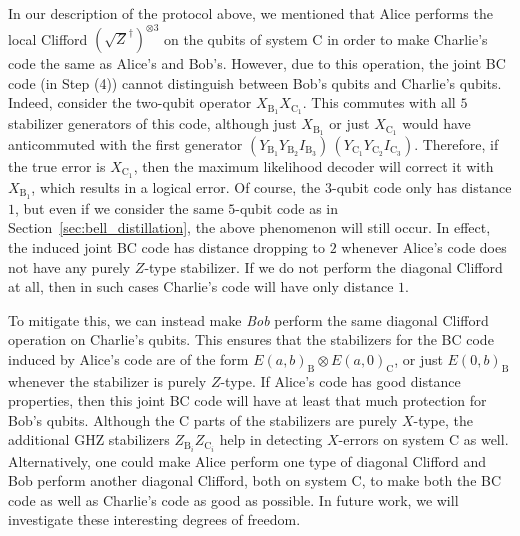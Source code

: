 \documentclass[journal,onecolumn]{IEEEtran}
\begin{document}
In our description of the protocol above, we mentioned that Alice performs the local Clifford $\left( \sqrt{Z}^\dagger \right)^{\otimes 3}$ on the qubits of system C in order to make Charlie's code the same as Alice's and Bob's.
However, due to this operation, the joint BC code (in Step (4)) cannot distinguish between Bob's qubits and Charlie's qubits.
Indeed, consider the two-qubit operator $X_{\text{B}_1} X_{\text{C}_1}$.
This commutes with all $5$ stabilizer generators of this code, although just $X_{\text{B}_1}$ or just $X_{\text{C}_1}$ would have anticommuted with the first generator $(Y_{\text{B}_1} Y_{\text{B}_2} I_{\text{B}_3}) \, (Y_{\text{C}_1} Y_{\text{C}_2} I_{\text{C}_3})$.
Therefore, if the true error is $X_{\text{C}_1}$, then the maximum likelihood decoder will correct it with $X_{\text{B}_1}$, which results in a logical error.
Of course, the $3$-qubit code only has distance $1$, but even if we consider the same $5$-qubit code as in Section~\ref{sec:bell_distillation}, the above phenomenon will still occur.
In effect, the induced joint BC code has distance dropping to $2$ whenever Alice's code does not have any purely $Z$-type stabilizer.
If we do not perform the diagonal Clifford at all, then in such cases Charlie's code will have only distance $1$.

To mitigate this, we can instead make \emph{Bob} perform the same diagonal Clifford operation on Charlie's qubits.
This ensures that the stabilizers for the BC code induced by Alice's code are of the form $E(a,b)_{\text{B}} \otimes E(a,0)_{\text{C}}$, or just $E(0,b)_{\text{B}}$ whenever the stabilizer is purely $Z$-type.
If Alice's code has good distance properties, then this joint BC code will have at least that much protection for Bob's qubits.
Although the C parts of the stabilizers are purely $X$-type, the additional GHZ stabilizers $Z_{\text{B}_i} Z_{\text{C}_i}$ help in detecting $X$-errors on system C as well.
Alternatively, one could make Alice perform one type of diagonal Clifford and Bob perform another diagonal Clifford, both on system C, to make both the BC code as well as Charlie's code as good as possible.
In future work, we will investigate these interesting degrees of freedom.
\end{document}
